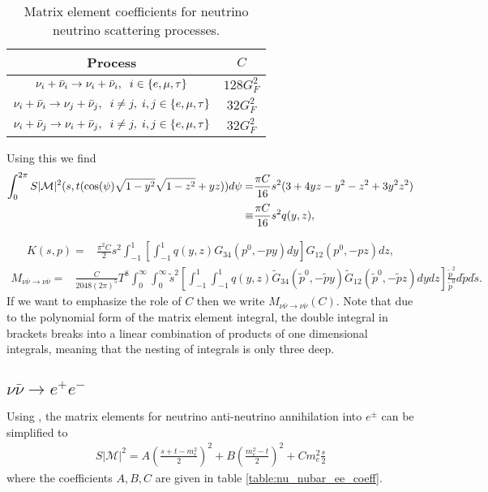 \begin{table}[H]
\centering 
\begin{tabular}{|c|c|}
\hline
Process &$C$  \\
\hline
$\nu_i+\bar\nu_i\rightarrow\nu_i+\bar\nu_i,\hspace{2mm} i\in\{e,\mu,\tau\}$& $128 G_F^2$\\
\hline
$\nu_i+\bar\nu_i\rightarrow\nu_j+\bar\nu_j,\hspace{2mm} i\neq j, \hspace{1mm} i,j\in\{e,\mu,\tau\}$& $32 G_F^2$\\
\hline
$\nu_i+\bar\nu_j\rightarrow\nu_i+\bar\nu_j,\hspace{2mm} i\neq j, \hspace{1mm} i,j\in\{e,\mu,\tau\}$& $32 G_F^2$\\
\hline
\end{tabular}
\caption{Matrix element coefficients for neutrino neutrino scattering processes.}
\label{table:nu_nubar_coeff}
\end{table}
Using this we find
 \begin{align}
\int_0^{2\pi} S |\mathcal{M}|^2 (s,t(\cos(\psi)\sqrt{1-y^2}\sqrt{1-z^2}+yz))d\psi=&\frac{\pi C}{16} s^2(3+4 yz-y^2-z^2+3y^2z^2)\notag\\
\equiv&\frac{\pi C}{16} s^2q(y,z),
\end{align}

\begin{align}
K(s,p)=&\frac{\pi^2C}{2}s^2\int_{-1}^1 \left[\int_{-1}^1q(y,z)G_{34}(p^0,-p y) dy\right] G_{12}(p^0,-p z)dz,
\end{align}
\begin{align}
M_{\nu\bar\nu\rightarrow\nu\bar\nu}=&\frac{C}{2048(2\pi)^5 }T^8\!\!\!\int_0^\infty\!\!\!\!\int_0^\infty\!\!\! \tilde{s}^2\left[\int_{-1}^1\!\int_{-1}^1q(y,z)\tilde{G}_{34}(\tilde p^0,-\tilde{p} y) \tilde{G}_{12}(\tilde p^0,-\tilde{p} z)dydz\right]\frac{\tilde{p}^2}{\tilde{p}^0}d\tilde{p}d\tilde{s}.
\end{align}
 If we want to emphasize the role of $C$ then we write $M_{\nu\bar\nu\rightarrow\nu\bar\nu}(C)$. Note that due to the polynomial form of the matrix element integral, the double integral in brackets breaks into a linear combination of products of one dimensional integrals, meaning that the nesting of integrals is only three deep.

\subsection{$\nu\bar{\nu}\rightarrow e^+e^-$}\label{nu_nubar_int}
Using , the matrix elements for neutrino anti-neutrino annihilation into $e^\pm$ can be simplified to
\begin{align}
S|\mathcal{M}|^2=A\left(\frac{s+t-m_e^2}{2}\right)^2+B\left(\frac{m_e^2-t}{2}\right)^2+Cm_e^2\frac{s}{2}
\end{align}
where the coefficients $A,B,C$ are given in table \ref{table:nu_nubar_ee_coeff}.

